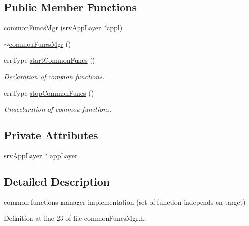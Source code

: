 \subsection*{Public Member Functions}
\begin{DoxyCompactItemize}
\item 
\hyperlink{classcommonFuncsMgr_a1f9fa1d92384285d9dab3d039e75a640}{commonFuncsMgr} (\hyperlink{classsrvAppLayer}{srvAppLayer} $\ast$appl)
\item 
\hyperlink{classcommonFuncsMgr_ac3e961817500b0862274cb5dbb1bff7b}{$\sim$commonFuncsMgr} ()
\item 
errType \hyperlink{classcommonFuncsMgr_a9bd0bd8c733b05611a2d013811b45351}{startCommonFuncs} ()
\begin{DoxyCompactList}\small\item\em Declaration of common functions. \item\end{DoxyCompactList}\item 
errType \hyperlink{classcommonFuncsMgr_a4c9a0f27ac4b60e41fc549e0c98bd914}{stopCommonFuncs} ()
\begin{DoxyCompactList}\small\item\em Undeclaration of common functions. \item\end{DoxyCompactList}\end{DoxyCompactItemize}
\subsection*{Private Attributes}
\begin{DoxyCompactItemize}
\item 
\hyperlink{classsrvAppLayer}{srvAppLayer} $\ast$ \hyperlink{classcommonFuncsMgr_a2dfac40cc291ca40160c829adef3ecfc}{appLayer}
\end{DoxyCompactItemize}


\subsection{Detailed Description}
common functions manager implementation (set of function independs on target) 

Definition at line 23 of file commonFuncsMgr.h.



